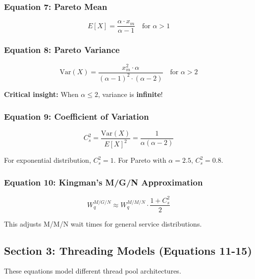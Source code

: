 \documentclass[11pt,a4paper]{article}
\begin{document}
\subsubsection{Equation 7: Pareto Mean}

\begin{equation}
E[X] = \frac{\alpha \cdot x_m}{\alpha - 1} \quad \text{for } \alpha > 1
\end{equation}

\subsubsection{Equation 8: Pareto Variance}

\begin{equation}
\text{Var}(X) = \frac{x_m^2 \cdot \alpha}{(\alpha-1)^2 \cdot (\alpha-2)} \quad \text{for } \alpha > 2
\end{equation}

\textbf{Critical insight:} When $\alpha \leq 2$, variance is \textbf{infinite}!

\subsubsection{Equation 9: Coefficient of Variation}

\begin{equation}
C_s^2 = \frac{\text{Var}(X)}{E[X]^2} = \frac{1}{\alpha(\alpha-2)}
\end{equation}

For exponential distribution, $C_s^2 = 1$. For Pareto with $\alpha = 2.5$, $C_s^2 = 0.8$.

\subsubsection{Equation 10: Kingman's M/G/N Approximation}

\begin{equation}
W_q^{M/G/N} \approx W_q^{M/M/N} \cdot \frac{1 + C_s^2}{2}
\end{equation}

This adjusts M/M/N wait times for general service distributions.

\subsection{Section 3: Threading Models (Equations 11-15)}

These equations model different thread pool architectures.
\end{document}

